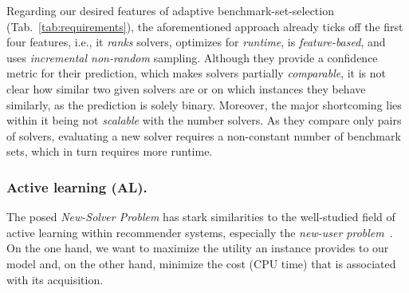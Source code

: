 \documentclass[runningheads]{llncs}
\begin{document}
Regarding our desired features of adaptive benchmark-set-selection (Tab.~\ref{tab:requirements}), the aforementioned approach already ticks off the first four features, i.e., it \emph{ranks} solvers, optimizes for \emph{runtime}, is \emph{feature-based}, and uses \emph{incremental non-random} sampling.
Although they provide a confidence metric for their prediction, which makes solvers partially \emph{comparable}, it is not clear how similar two given solvers are or on which instances they behave similarly, as the prediction is solely binary.
Moreover, the major shortcoming lies within it being not \emph{scalable} with the number solvers.
As they compare only pairs of solvers, evaluating a new solver requires a non-constant number of benchmark sets, which in turn requires more runtime.

\subsubsection{Active learning (AL).}
The posed \emph{New-Solver Problem} has stark similarities to the well-studied field of active learning within recommender systems, especially the \emph{new-user problem}~\cite{RubensESK15}.
On the one hand, we want to maximize the utility an instance provides to our model and, on the other hand, minimize the cost (CPU time) that is associated with its acquisition.
\end{document}

